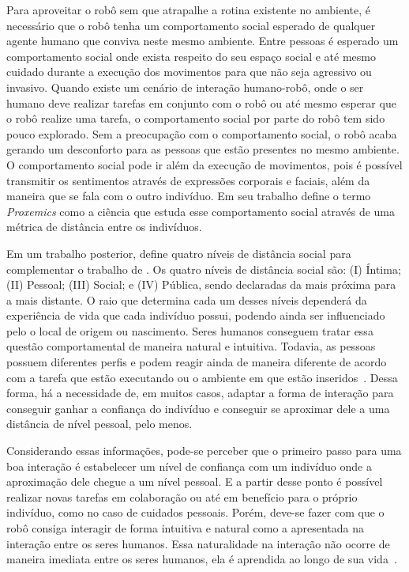 Para aproveitar o robô sem que atrapalhe a rotina existente no ambiente, é necessário que o robô tenha um comportamento social esperado de qualquer agente humano que conviva neste mesmo ambiente. Entre pessoas é esperado um comportamento social onde exista respeito do seu espaço social e até mesmo cuidado durante a execução dos movimentos para que não seja agressivo ou invasivo. Quando existe um cenário de interação humano-robô, onde o ser humano deve realizar tarefas em conjunto com o robô ou até mesmo esperar que o robô realize uma tarefa, o comportamento social por parte do robô tem sido pouco explorado. Sem a preocupação com o comportamento social, o robô acaba gerando um desconforto para as pessoas que estão presentes no mesmo ambiente. O comportamento social pode ir além da execução de movimentos, pois é possível transmitir os sentimentos através de expressões corporais e faciais, além da maneira que se fala com o outro indivíduo. Em seu trabalho  define o termo \emph{Proxemics} como a ciência que estuda esse comportamento social através de uma métrica de distância entre os indivíduos.

Em um trabalho posterior,  define quatro níveis de distância social para complementar o trabalho de . Os quatro níveis de distância social são: (I) Íntima; (II) Pessoal; (III) Social; e (IV) Pública, sendo declaradas da mais próxima para a mais distante. O raio que determina cada um desses níveis dependerá da experiência de vida que cada indivíduo possui, podendo ainda ser influenciado pelo o local de origem ou nascimento. Seres humanos conseguem tratar essa questão comportamental de maneira natural e intuitiva. Todavia, as pessoas possuem diferentes perfis e podem reagir ainda de maneira diferente de acordo com a tarefa que estão executando ou o ambiente em que estão inseridos~\cite{jung:1991}. Dessa forma, há a necessidade de, em muitos casos, adaptar a forma de interação para conseguir ganhar a confiança do indivíduo e conseguir se aproximar dele a uma distância de nível pessoal, pelo menos.

Considerando essas informações, pode-se perceber que o primeiro passo para uma boa interação é estabelecer um nível de confiança com um indivíduo onde a aproximação dele chegue a um nível pessoal. E a partir desse ponto é possível realizar novas tarefas em colaboração ou até em benefício para o próprio indivíduo, como no caso de cuidados pessoais. Porém, deve-se fazer com que o robô consiga interagir de forma intuitiva e natural como a apresentada na interação entre os seres humanos. Essa naturalidade na interação não ocorre de maneira imediata entre os seres humanos, ela é aprendida ao longo de sua vida~\cite{hall:1969, argyle:1988}.

